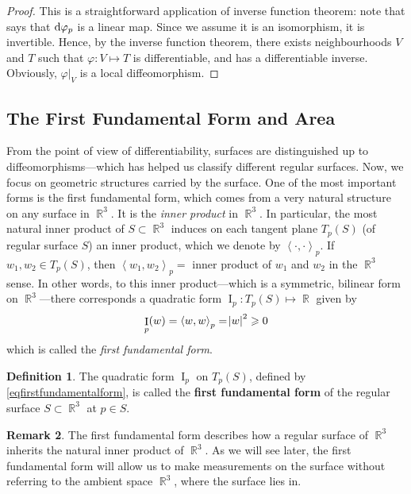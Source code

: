 \documentclass{amsart} %
\theoremstyle{mytheoremstyle}
\theoremstyle{definition}
\newtheorem{definition}{Definition}[section]
\newtheorem{remark}[definition]{Remark}
\numberwithin{equation}{section}
\DeclareMathOperator{\R}{\mathbb{R}}
\DeclareMathOperator{\I}{I}
\DeclareMathOperator{\1}{\mathbbm{1}}
\DeclareMathOperator{\D}{\dif}
\renewcommand{\geq}{\geqslant}
\renewcommand{\phi}{\varphi}
\newcommand{\innerproduct}[2]{\left\langle #1,#2 \right\rangle}
\renewcommand{\geq}{\geqslant}
\renewcommand{\phi}{\varphi}
\begin{document}
\begin{proof}
	This is a straightforward application of inverse function theorem: note that  says that $\D \phi_p$ is a linear map. Since we assume it is an isomorphism, it is invertible. Hence, by the inverse function theorem, there exists neighbourhoods $V$ and $T$ such that $\phi : V \mapsto T$ is differentiable, and has a differentiable inverse. Obviously, $\phi|_{V}$ is a local diffeomorphism.
\end{proof}




\subsection{The First Fundamental Form and Area}
From the point of view of differentiability, surfaces are distinguished up to diffeomorphisms---which has helped us classify different regular surfaces. Now, we focus on geometric structures carried by the surface. One of the most important forms is the first fundamental form, which comes from a very natural structure on any surface in $\R^3$. It is the \textit{inner product} in $\R^3$. In particular, the most natural inner product of $S \subset \R^3$ induces on each tangent plane $T_p(S)$ (of regular surface $S$) an inner product, which we denote by $\innerproduct{\cdot}{\cdot}_{p}$. If $w_1,w_2 \in T_p(S)$, then $\innerproduct{w_1}{w_2}_{p} =$ inner product of $w_1 $ and $w_2$ in the $\R^3$ sense. In other words, to this inner product---which is a symmetric, bilinear form on $\R^3$---there corresponds a quadratic form $\I_p : T_p (S) \mapsto \R$ given by
\begin{align}
	\label{eqfirstfundamentalform}
	\I_p (w) = \innerproduct{w}{w}_{p} = \abs{w}^2 \geq 0
\end{align}
which is called the \textit{first fundamental form}.

\begin{definition}
	\label{deffirstfundamentalform}
	The quadratic form $\I_p$ on $T_p (S)$, defined by \eqref{eqfirstfundamentalform}, is called the \textbf{first fundamental form} of the regular surface $S \subset \R^3$ at $p \in S$.
\end{definition}

\begin{remark}
	The first fundamental form describes how a regular surface of $\R^3$ inherits the natural inner product of $\R^3$. As we will see later, the first fundamental form will allow us to make measurements on the surface without referring to the ambient space $\R^3$, where the surface lies in.
\end{remark}
\end{document}
